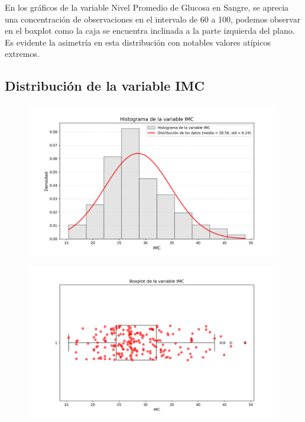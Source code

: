 \documentclass[a4paper, 12pt]{article}
\begin{document}
En los gráficos de la variable Nivel Promedio de Glucosa en Sangre, se aprecia una concentración de observaciones en el intervalo de 60 a 100, podemos observar en el boxplot como la caja se encuentra inclinada a la parte izquierda del plano.
Es evidente la asimetría en esta distribución con notables valores atípicos extremos.



\subsection{Distribución de la variable IMC}

\begin{figure}[H]
    \centering
    \includegraphics[width=1\textwidth]{img/Histogramas/Histograma_IMC.png}
\end{figure}

\begin{figure}[H]
    \centering
    \includegraphics[width=1\textwidth]{img/Boxplot/Boxplt_IMC.png}
\end{figure}
\end{document}
